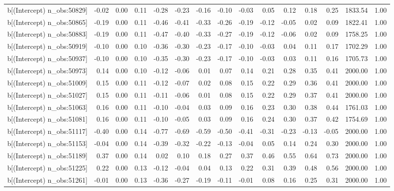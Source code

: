 \begin{table}[ht]
\begin{tabular}{rrrrrrrrrrrrrrr}
  b[(Intercept) n\_obs:50829] & -0.02 & 0.00 & 0.11 & -0.28 & -0.23 & -0.16 & -0.10 & -0.03 & 0.05 & 0.12 & 0.18 & 0.25 & 1833.54 & 1.00 \\ 
  b[(Intercept) n\_obs:50865] & -0.19 & 0.00 & 0.11 & -0.46 & -0.41 & -0.33 & -0.26 & -0.19 & -0.12 & -0.05 & 0.02 & 0.09 & 1822.41 & 1.00 \\ 
  b[(Intercept) n\_obs:50883] & -0.19 & 0.00 & 0.11 & -0.47 & -0.40 & -0.33 & -0.27 & -0.19 & -0.12 & -0.06 & 0.02 & 0.09 & 1758.25 & 1.00 \\ 
  b[(Intercept) n\_obs:50919] & -0.10 & 0.00 & 0.10 & -0.36 & -0.30 & -0.23 & -0.17 & -0.10 & -0.03 & 0.04 & 0.11 & 0.17 & 1702.29 & 1.00 \\ 
  b[(Intercept) n\_obs:50937] & -0.10 & 0.00 & 0.10 & -0.35 & -0.30 & -0.23 & -0.17 & -0.10 & -0.03 & 0.03 & 0.11 & 0.16 & 1705.73 & 1.00 \\ 
  b[(Intercept) n\_obs:50973] & 0.14 & 0.00 & 0.10 & -0.12 & -0.06 & 0.01 & 0.07 & 0.14 & 0.21 & 0.28 & 0.35 & 0.41 & 2000.00 & 1.00 \\ 
  b[(Intercept) n\_obs:51009] & 0.15 & 0.00 & 0.11 & -0.12 & -0.07 & 0.02 & 0.08 & 0.15 & 0.22 & 0.29 & 0.36 & 0.41 & 2000.00 & 1.00 \\ 
  b[(Intercept) n\_obs:51027] & 0.15 & 0.00 & 0.11 & -0.11 & -0.06 & 0.01 & 0.08 & 0.15 & 0.22 & 0.29 & 0.37 & 0.41 & 2000.00 & 1.00 \\ 
  b[(Intercept) n\_obs:51063] & 0.16 & 0.00 & 0.11 & -0.10 & -0.04 & 0.03 & 0.09 & 0.16 & 0.23 & 0.30 & 0.38 & 0.44 & 1761.03 & 1.00 \\ 
  b[(Intercept) n\_obs:51081] & 0.16 & 0.00 & 0.11 & -0.10 & -0.05 & 0.03 & 0.09 & 0.16 & 0.24 & 0.30 & 0.37 & 0.42 & 1754.69 & 1.00 \\ 
  b[(Intercept) n\_obs:51117] & -0.40 & 0.00 & 0.14 & -0.77 & -0.69 & -0.59 & -0.50 & -0.41 & -0.31 & -0.23 & -0.13 & -0.05 & 2000.00 & 1.00 \\ 
  b[(Intercept) n\_obs:51153] & -0.04 & 0.00 & 0.14 & -0.39 & -0.32 & -0.22 & -0.13 & -0.04 & 0.05 & 0.14 & 0.24 & 0.30 & 2000.00 & 1.00 \\ 
  b[(Intercept) n\_obs:51189] & 0.37 & 0.00 & 0.14 & 0.02 & 0.10 & 0.18 & 0.27 & 0.37 & 0.46 & 0.55 & 0.64 & 0.73 & 2000.00 & 1.00 \\ 
  b[(Intercept) n\_obs:51225] & 0.22 & 0.00 & 0.13 & -0.12 & -0.04 & 0.04 & 0.13 & 0.22 & 0.31 & 0.39 & 0.48 & 0.56 & 2000.00 & 1.00 \\ 
  b[(Intercept) n\_obs:51261] & -0.01 & 0.00 & 0.13 & -0.36 & -0.27 & -0.19 & -0.11 & -0.01 & 0.08 & 0.16 & 0.25 & 0.31 & 2000.00 & 1.00 \\ 

\end{tabular}
\end{table}
